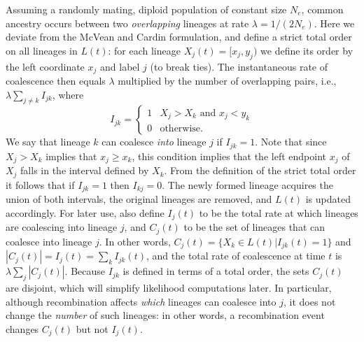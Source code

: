\documentclass{article}
\begin{document}
Assuming a randomly mating, diploid population of constant size $N_e$,
common ancestry occurs between
two \emph{overlapping} lineages at rate $\lambda = 1/(2N_e)$.
Here we deviate from the McVean and Cardin formulation,
and define a strict total order on all lineages in $L(t)$:
for each lineage $X_j(t) = [x_{j}, y_{j})$ we define its
order by the left coordinate $x_j$ and label $j$ (to break ties).
The instantaneous rate of coalescence then equals $\lambda$
multiplied by the number of overlapping pairs,
i.e., $\lambda \sum_{j \neq k} I_{jk}$,
where
\begin{equation} \label{def:coal}
I_{jk} = \begin{cases}
    1 & X_j > X_k \text{ and } x_j < y_k \\
    0 & \text{otherwise.}
\end{cases}
\end{equation}
We say that lineage $k$ can coalesce \emph{into} lineage $j$ if $I_{jk} = 1$.
Note that since $X_j > X_k$ implies that $x_j \ge x_k$,
this condition implies that the left endpoint $x_j$ of $X_j$
falls in the interval defined by $X_k$.
From the definition of the strict total order it follows that if $I_{jk} = 1$
then $I_{kj} = 0$.
The newly formed lineage acquires the union of both intervals,
the original lineages are removed, and $L(t)$ is updated accordingly.
For later use, also define $I_j(t)$ to be the total rate at which lineages
are coalescing into lineage $j$,
and $C_j(t)$ to be the set of lineages that can coalesce into lineage $j$.
In other words,
$C_j(t) = \{X_k \in L(t) | I_{jk}(t) = 1\}$
and $|C_j(t)| = I_{j}(t) = \sum_{k} I_{jk}(t)$,
and the total rate of coalescence at time $t$ is $\lambda \sum_{j} |C_j(t)|$.  
Because $I_{jk}$ is defined in terms of a total order, the sets $C_j(t)$ are disjoint,
which will simplify likelihood computations later. In particular, although
recombination affects \emph{which} lineages can coalesce into $j$, it does not
change the \emph{number} of such lineages: in other words, a recombination
event changes $C_j(t)$ but not $I_{j}(t)$.

\end{document}
